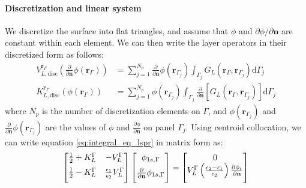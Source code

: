 \paragraph{Discretization and linear system}

We discretize the surface into flat triangles, and assume that  $\phi$ and 
$\partial \phi/\partial \mathbf{n}$ are constant within each element. We can
then write the layer operators in their discretized form as follows:
%
\begin{align} \label{eq:layers_disc}
V_{L,\text{disc}}^{\mathbf{r}_\Gamma} \left( \frac{\partial}{\partial \mathbf{n}} \phi(\mathbf{r}_{\Gamma}) \right) &= \sum_{j=1}^{N_p} \frac{\partial}{\partial \mathbf{n}} \phi(\mathbf{r}_{\Gamma_j}) \int_{\Gamma_j} G_L(\mathbf{r}_\Gamma,\mathbf{r}_{\Gamma_j})  \mathrm{d} \Gamma_j  \nonumber \\
K_{L,\text{disc}}^{\mathbf{r}_\Gamma}(\phi(\mathbf{r}_{\Gamma})) &=  \sum_{j=1}^{N_p}\phi(\mathbf{r}_{\Gamma_j})\int_{\Gamma_j} \frac{\partial}{\partial \mathbf{n}} \left[ G_L(\mathbf{r}_\Gamma,\mathbf{r}_{\Gamma_j}) \right]\mathrm{d} \Gamma_j
\end{align}
%
\noindent where $N_p$ is the number of discretization elements on $\Gamma$, 
and $\phi(\mathbf{r}_{\Gamma_j})$ and $\frac{\partial}{\partial \mathbf{n}} 
\phi(\mathbf{r}_{\Gamma_j})$ are the values of $\phi$ and 
$\frac{\partial \phi}{\partial \mathbf{n}}$ on panel $\Gamma_j$.
Using centroid collocation, we can write equation \eqref{eq:integral_eq_lspr} in matrix form as:
%
 \begin{equation} \label{eq:matrix_lspr}
 \left[
    \begin{matrix} 
       \frac{1}{2} + K_{L}^{\Gamma} & -V_{L}^{\Gamma}  \vspace{0.2cm} \\
       \frac{1}{2} - K_{L}^{\Gamma} &  \frac{\epsilon_1}{\epsilon_2} V_{L}^{\Gamma}  \vspace{0.2cm} 
    \end{matrix}
    \right] \left[ 
    \begin{matrix} 
       \phi_{1s,\Gamma} \vspace{0.2cm} \\
       \frac{\partial}{\partial \mathbf{n}} \phi_{1s,\Gamma} \vspace{0.2cm}
    \end{matrix} 
     \right] =   
    \left[
    \begin{matrix} 
       0 \\
       V_{L}^{\Gamma} \left(\frac{\epsilon_2-\epsilon_1}{\epsilon_2}\right) \frac{\partial\phi_i}{\partial\mathbf{n}} \vspace{0.2cm} 
    \end{matrix}
    \right]
 \end{equation}
